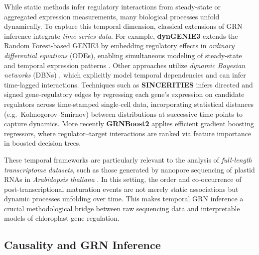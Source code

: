 \documentclass[
]{article}
\theoremstyle{definition}
\theoremstyle{remark}
\begin{document}
While static methods infer regulatory interactions from steady-state or
aggregated expression measurements, many biological processes unfold
dynamically. To capture this temporal dimension, classical extensions of
GRN inference integrate \emph{time-series data}. For example,
\textbf{dynGENIE3} extends the Random Forest-based GENIE3 by embedding
regulatory effects in \emph{ordinary differential equations} (ODEs),
enabling simultaneous modeling of steady-state and temporal expression
patterns . Other approaches
utilize \emph{dynamic Bayesian networks} (DBNs)
, which explicitly model temporal
dependencies and can infer time-lagged interactions. Techniques such as
\textbf{SINCERITIES} 
infers directed and signed gene‐regulatory edges by regressing each
gene's expression on candidate regulators across time‐stamped
single‐cell data, incorporating statistical distances
(e.g.~Kolmogorov--Smirnov) between distributions at successive time
points to capture dynamics. More recently \textbf{GRNBoost2}
 applies efficient gradient
boosting regressors, where regulator--target interactions are ranked via
feature importance in boosted decision trees.

These temporal frameworks are particularly relevant to the analysis of
\emph{full-length transcriptome datasets}, such as those generated by
nanopore sequencing of plastid RNAs in \emph{Arabidopsis thaliana}
. In this setting, the order and
co-occurrence of post-transcriptional maturation events are not merely
static associations but dynamic processes unfolding over time. This
makes temporal GRN inference a crucial methodological bridge between raw
sequencing data and interpretable models of chloroplast gene regulation.

\subsection{Causality and GRN
Inference}\label{causality-and-grn-inference}
\end{document}
